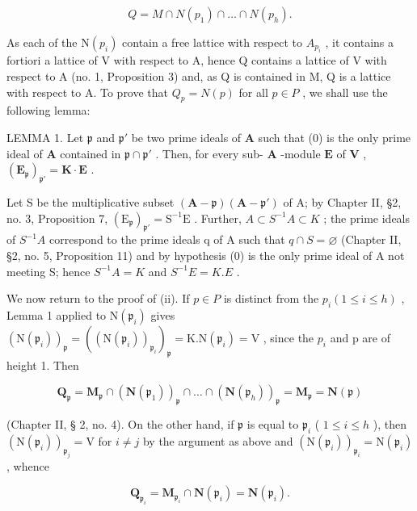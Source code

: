 \[
Q = M \cap N (p _ {1}) \cap \dots \cap N (p _ {h}).
\]

As each of the \(\mathrm{N}(p_{i})\) contain a free lattice with respect to \(A_{p_{i}}\) , it contains a fortiori a lattice of V with respect to A, hence Q contains a lattice of V with respect to A (no. 1, Proposition 3) and, as Q is contained in M, Q is a lattice with respect to A. To prove that \(Q_{p} = N(p)\) for all \(p \in P\) , we shall use the following lemma:

LEMMA 1. Let \(\mathfrak{p}\) and \(\mathfrak{p}'\) be two prime ideals of \(\mathbf{A}\) such that (0) is the only prime ideal of \(\mathbf{A}\) contained in \(\mathfrak{p} \cap \mathfrak{p}'\) . Then, for every sub- \(\mathbf{A}\) -module \(\mathbf{E}\) of \(\mathbf{V}\) , \((\mathbf{E}_{\mathfrak{p}})_{\mathfrak{p}'} = \mathbf{K} \cdot \mathbf{E}\) .

Let S be the multiplicative subset \((\mathbf{A}-\mathfrak{p})(\mathbf{A}-\mathfrak{p}')\) of A; by Chapter II, §2, no. 3, Proposition 7, \((\mathrm{E}_{\mathfrak{p}})_{\mathfrak{p}'}=\mathrm{S}^{-1}\mathrm{E}\) . Further, \(A\subset S^{-1}A\subset K\) ; the prime ideals of \(S^{-1}A\) correspond to the prime ideals q of A such that \(q\cap S=\varnothing\) (Chapter II, §2, no. 5, Proposition 11) and by hypothesis (0) is the only prime ideal of A not meeting S; hence \(S^{-1}A=K\) and \(S^{-1}E=K.E\) .

We now return to the proof of (ii). If \(p \in P\) is distinct from the \(p_i (1 \leqslant i \leqslant h)\) , Lemma 1 applied to \(\mathrm{N}(\mathfrak{p}_i)\) gives \((\mathrm{N}(\mathfrak{p}_i))_{\mathfrak{p}} = ((\mathrm{N}(\mathfrak{p}_i))_{\mathfrak{p}_i})_{\mathfrak{p}} = \mathrm{K}. \mathrm{N}(\mathfrak{p}_i) = \mathrm{V}\) , since the \(p_i\) and p are of height 1. Then

\[
\mathbf {Q} _ {\mathfrak {p}} = \mathbf {M} _ {\mathfrak {p}} \cap (\mathbf {N} (\mathfrak {p} _ {1})) _ {\mathfrak {p}} \cap \dots \cap (\mathbf {N} (\mathfrak {p} _ {h})) _ {\mathfrak {p}} = \mathbf {M} _ {\mathfrak {p}} = \mathbf {N} (\mathfrak {p})
\]

(Chapter II, § 2, no. 4). On the other hand, if \(\mathfrak{p}\) is equal to \(\mathfrak{p}_i\) ( \(1 \leqslant i \leqslant h\) ), then \((\mathrm{N}(\mathfrak{p}_i))_{\mathfrak{p}_j} = \mathrm{V}\) for \(i \neq j\) by the argument as above and \((\mathrm{N}(\mathfrak{p}_i))_{\mathfrak{p}_i} = \mathrm{N}(\mathfrak{p}_i)\) , whence

\[
\mathbf {Q} _ {\mathfrak {p} _ {i}} = \mathbf {M} _ {\mathfrak {p} _ {i}} \cap \mathbf {N} (\mathfrak {p} _ {i}) = \mathbf {N} (\mathfrak {p} _ {i}).
\]

